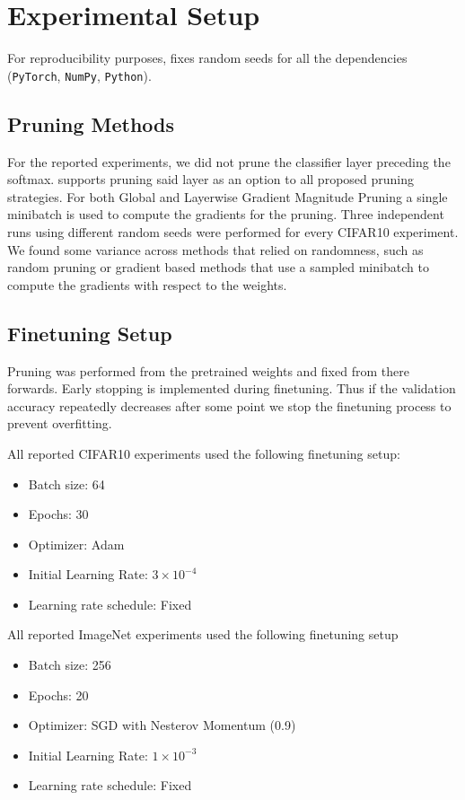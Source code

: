 
\section{Experimental Setup} \label{apx:exp}

For reproducibility purposes, \SB{} fixes random seeds for all the dependencies (\texttt{PyTorch}, \texttt{NumPy}, \texttt{Python}).


\subsection{Pruning Methods}

For the reported experiments, we did not prune the classifier layer preceding the softmax.
%
\SB{} supports pruning said layer as an option to all proposed pruning strategies.
%
For both Global and Layerwise Gradient Magnitude Pruning a single minibatch is used to compute the gradients for the pruning.
%
Three independent runs using different random seeds were performed for every CIFAR10 experiment.
%
We found some variance across methods that relied on randomness, such as random pruning or gradient based methods that use a sampled minibatch to compute the gradients with respect to the weights.


\subsection{Finetuning Setup}

Pruning was performed from the pretrained weights and fixed from there forwards.
%
%
Early stopping is implemented during finetuning.
%
Thus if the validation accuracy repeatedly decreases after some point we stop the finetuning process to prevent overfitting.
%

All reported CIFAR10 experiments used the following finetuning setup:
\begin{itemize}[leftmargin=4mm]
    \itemsep-2pt
    \vspace{-2mm}
    \item Batch size: 64
    \item Epochs: 30
    \item Optimizer: Adam
    \item Initial Learning Rate: $3 \times 10^{-4}$
    \item Learning rate schedule: Fixed
\end{itemize}
%
All reported ImageNet experiments used the following finetuning setup
\begin{itemize}[leftmargin=4mm]
    \itemsep-2pt
    \vspace{-2mm}
    \item Batch size: 256
    \item Epochs: 20
    \item Optimizer: SGD with Nesterov Momentum (0.9)
    \item Initial Learning Rate: $1 \times 10^{-3}$
    \item Learning rate schedule: Fixed
\end{itemize}
